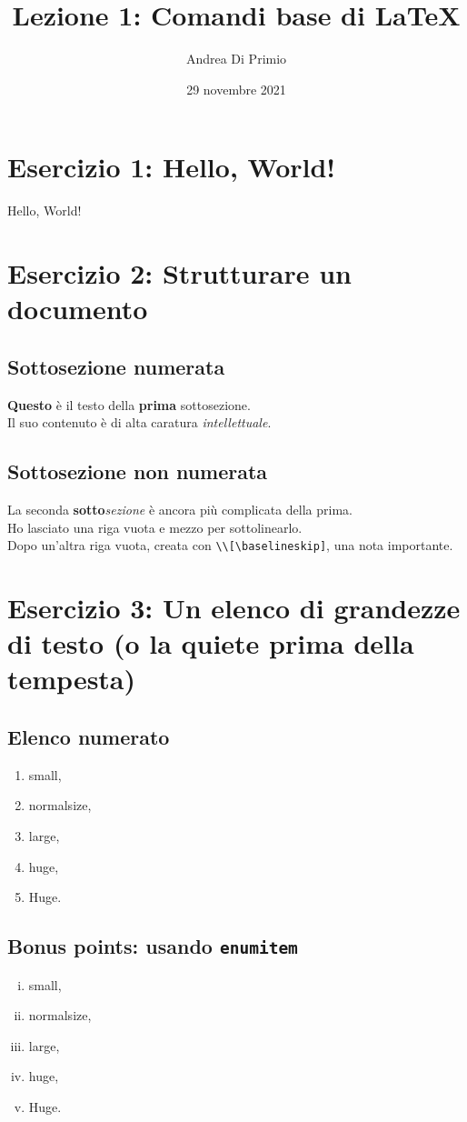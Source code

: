 \documentclass[a4paper, 10pt]{article}
\author{Andrea Di Primio}
\date{29 novembre 2021}
\title{Lezione 1: Comandi base di \LaTeX}
\begin{document}
	\maketitle
	\section{Esercizio 1: Hello, World!}
	Hello, World!
	\section{Esercizio 2: Strutturare un documento}
		\subsection{Sottosezione numerata}
		\textbf{Questo} è il testo della \textbf{prima} sottosezione.\\ 
		Il suo contenuto è di alta caratura \textit{intellettuale}.
		\subsection*{Sottosezione non numerata}
		La seconda \textbf{sotto}\textit{sezione} è ancora più complicata della prima.\\[1.5\baselineskip] 
		Ho lasciato una riga vuota e mezzo per sottolinearlo.\\[\baselineskip] 
		Dopo un'altra riga vuota, creata con \verb!\\[\baselineskip]!, una nota importante.
	\section{Esercizio 3: Un elenco di grandezze di testo {\tiny (o la quiete prima della tempesta)}}
		\subsection{Elenco numerato}
		\begin{enumerate}
			\item {\small small},
			\item {\normalsize normalsize},
			\item {\large large},
			\item {\huge huge},
			\item {\Huge Huge}.
		\end{enumerate}
		\subsection{Bonus points: usando \texttt{enumitem}}
		\begin{enumerate}[(i)]
			\item {\small small},
			\item {\normalsize normalsize},
			\item {\large large},
			\item {\huge huge},
			\item {\Huge Huge}.
		\end{enumerate}
\end{document}
